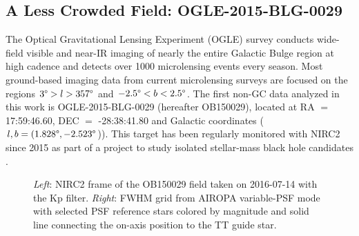 \documentclass[]{spie}  %
\begin{document}

 
\subsection{A Less Crowded Field: OGLE-2015-BLG-0029} \label{sec:ogle-data}
The Optical Gravitational Lensing Experiment (OGLE) survey \cite{udalski:1992a} conducts wide-field visible and near-IR imaging of nearly the entire Galactic Bulge region at high cadence and detects over 1000 microlensing events every season. Most ground-based imaging data from current microlensing surveys are focused on the regions $3\degree > l > 357\degree$ and $-2.5\degree < b < 2.5\degree$. The first non-GC data analyzed in this work is OGLE-2015-BLG-0029 (hereafter OB150029), located at RA $=$ 17:59:46.60, DEC $=$ -28:38:41.80 and Galactic coordinates ($l,b = (1.828\degree, -2.523\degree$)). This target has been regularly monitored with NIRC2 since 2015 as part of a project to study isolated stellar-mass black hole candidates \cite{lu:inprep}.
\\
\begin{figure}[!h]
 \caption{\footnotesize \textit{Left}: NIRC2 frame of the OB150029 field taken on 2016-07-14 with the Kp filter. \textit{Right}: FWHM grid from AIROPA variable-PSF mode with selected PSF reference stars colored by magnitude and solid line connecting the on-axis position to the TT guide star.} \label{fig:ob150029}
\end{figure}
\end{document}
